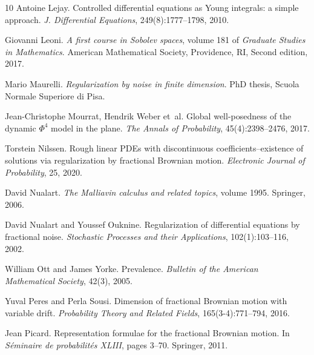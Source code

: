 \documentclass[10pt]{article}
\newcommand{\tmtextit}[1]{{\itshape{#1}}}
\begin{document}
\begin{thebibliography}{10}
  Antoine Lejay. {\newblock}Controlled differential
  equations as Young integrals: a simple approach. {\newblock}\tmtextit{J.
  Differential Equations}, 249(8):1777--1798, 2010.{\newblock}
  
  Giovanni Leoni. {\newblock}\tmtextit{A first course in
  Sobolev spaces},  volume  181  of \tmtextit{Graduate Studies in
  Mathematics}. {\newblock}American Mathematical Society, Providence, RI,
  Second  edition, 2017.{\newblock}
  
  Mario Maurelli. {\newblock}\tmtextit{Regularization by
  noise in finite dimension}. {\newblock}PhD thesis, Scuola Normale Superiore
  di Pisa.{\newblock}
  
  Jean-Christophe Mourrat, Hendrik Weber et~al.
  {\newblock}Global well-posedness of the dynamic $\Phi^4$ model in the plane.
  {\newblock}\tmtextit{The Annals of Probability}, 45(4):2398--2476,
  2017.{\newblock}
  
  Torstein Nilssen. {\newblock}Rough linear PDEs with
  discontinuous coefficients--existence of solutions via regularization by
  fractional Brownian motion. {\newblock}\tmtextit{Electronic Journal of
  Probability}, 25, 2020.{\newblock}
  
  David Nualart. {\newblock}\tmtextit{The Malliavin
  calculus and related topics},  volume  1995. {\newblock}Springer,
  2006.{\newblock}
  
  David Nualart  and  Youssef Ouknine.
  {\newblock}Regularization of differential equations by fractional noise.
  {\newblock}\tmtextit{Stochastic Processes and their Applications},
  102(1):103--116, 2002.{\newblock}
  
  William Ott  and  James Yorke. {\newblock}Prevalence.
  {\newblock}\tmtextit{Bulletin of the American Mathematical Society}, 42(3),
  2005.{\newblock}
  
  Yuval Peres  and  Perla Sousi. {\newblock}Dimension of
  fractional Brownian motion with variable drift.
  {\newblock}\tmtextit{Probability Theory and Related Fields},
  165(3-4):771--794, 2016.{\newblock}
  
  Jean Picard. {\newblock}Representation formulae for the
  fractional Brownian motion. {\newblock}In \tmtextit{S{\'e}minaire de
  probabilit{\'e}s XLIII},  pages  3--70. Springer, 2011.{\newblock}
  

\end{thebibliography}
\end{document}
